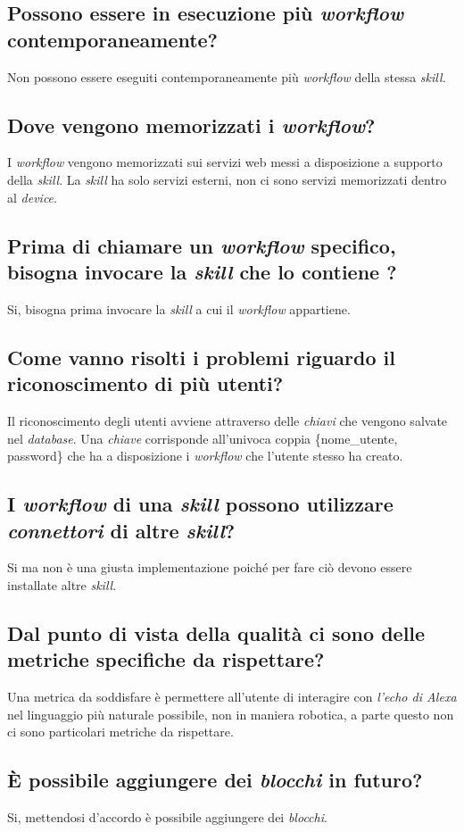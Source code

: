 \documentclass[a4paper,12pt]{article}
\begin{document}
	\subsection{Possono essere in esecuzione più \textit{workflow} contemporaneamente?}
	Non possono essere eseguiti contemporaneamente più \textit{workflow} della stessa \textit{skill.}
	\subsection{Dove vengono memorizzati i \textit{workflow}?}
	I \textit{workflow} vengono memorizzati sui servizi web messi a disposizione a supporto della \textit{skill}. La \textit{skill} ha solo servizi esterni, non ci sono servizi memorizzati dentro al \textit{device}. 
	\subsection{Prima di chiamare un \textit{workflow} specifico, bisogna invocare la \textit{skill} che lo contiene ?}
	Si, bisogna prima invocare la \textit{skill} a cui il \textit{workflow} appartiene.
	\subsection{Come vanno risolti i problemi riguardo il riconoscimento di più utenti?}
	Il riconoscimento degli utenti avviene attraverso delle \textit{chiavi} che vengono salvate nel \textit{database}. Una \textit{chiave} corrisponde all'univoca coppia \{nome\_utente, password\} che ha a disposizione i \textit{workflow} che l'utente stesso  ha creato.
	\subsection{I \textit{workflow} di una \textit{skill} possono utilizzare \textit{connettori}  di altre \textit{skill}?}
	Si ma non è una giusta implementazione poiché per fare ciò devono essere installate altre \textit{skill}.
    \subsection{Dal punto di vista della qualità ci sono delle metriche specifiche da rispettare?}
    Una metrica da soddisfare è permettere all'utente di interagire con \textit{l'echo di Alexa} nel linguaggio più naturale possibile, non in maniera robotica, a parte questo non ci sono particolari metriche da rispettare.
    \subsection{È possibile aggiungere dei \textit{blocchi} in futuro?}
    Si, mettendosi d'accordo è possibile aggiungere dei \textit{blocchi}.	
		\label{LastPage}
\end{document}
